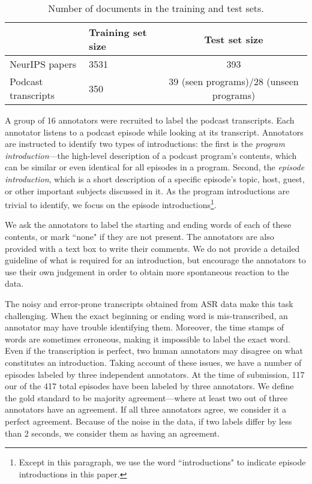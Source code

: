 \begin{table*}[h]
\centering
\begin{tabular}{llc}
\hline &  \textbf{Training set size} & \textbf{Test set size} \\ \hline
NeurIPS papers & 3531  & 393 \\
Podcast transcripts & 350  & 39 (seen programs)/28 (unseen programs) \\
\hline
\end{tabular}
\caption{ \label{table:data_stats} Number of documents in the training and test sets.}
\end{table*}


A group of 16 annotators were recruited to label the podcast transcripts. Each annotator listens to a podcast episode while looking at its transcript. Annotators are instructed to identify two types of introductions: the first is the \emph{program introduction}---the high-level description of a podcast program's contents, which can be similar or even identical for all episodes in a program. Second, the \emph{episode introduction}, which is a short description of a specific episode's topic, host, guest, or other important subjects discussed in it.  As the program introductions are trivial to identify, we focus on the episode introductions\footnote{Except in this paragraph, we use the word ``introductions" to indicate episode introductions in this paper.}. 

We ask the annotators to label the starting and ending words of each of these contents, or mark ``none" if they are not present. The annotators are also provided with a text box to write their comments. We do not provide a detailed guideline of what is required for an introduction, but encourage the annotators to use their own judgement in order to obtain more spontaneous reaction to the data.

The noisy and error-prone transcripts obtained from ASR data make this task challenging. When the exact beginning or ending word is mis-transcribed, an annotator may have trouble identifying them. Moreover, the time stamps of words are sometimes erroneous, making it impossible to label the exact word. Even if the transcription is perfect, two human annotators may disagree on what constitutes an introduction. Taking account of these issues, we have a number of episodes labeled by three independent annotators. At the time of submission, 117 our of the 417 total episodes have been labeled by three annotators. We define the gold standard to be majority agreement---where at least two out of three annotators have an agreement. If all three annotators agree, we consider it a perfect agreement. Because of the noise in the data, if two labels differ by less than 2 seconds, we consider them as having an agreement. 

